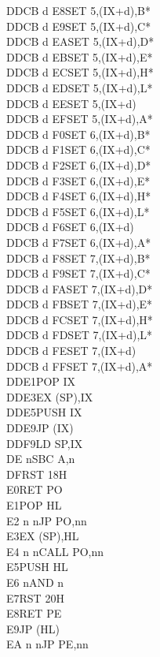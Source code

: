 \documentclass[oneside,a4paper]{book}
\begin{document}
\begin{multicols}{3}
{\begin{tabbing}
DDCB d E8\>SET 5,(IX+d),B*\\
DDCB d E9\>SET 5,(IX+d),C*\\
DDCB d EA\>SET 5,(IX+d),D*\\
DDCB d EB\>SET 5,(IX+d),E*\\
DDCB d EC\>SET 5,(IX+d),H*\\
DDCB d ED\>SET 5,(IX+d),L*\\
DDCB d EE\>SET 5,(IX+d)\\
DDCB d EF\>SET 5,(IX+d),A*\\
DDCB d F0\>SET 6,(IX+d),B*\\
DDCB d F1\>SET 6,(IX+d),C*\\
DDCB d F2\>SET 6,(IX+d),D*\\
DDCB d F3\>SET 6,(IX+d),E*\\
DDCB d F4\>SET 6,(IX+d),H*\\
DDCB d F5\>SET 6,(IX+d),L*\\
DDCB d F6\>SET 6,(IX+d)\\
DDCB d F7\>SET 6,(IX+d),A*\\
DDCB d F8\>SET 7,(IX+d),B*\\
DDCB d F9\>SET 7,(IX+d),C*\\
DDCB d FA\>SET 7,(IX+d),D*\\
DDCB d FB\>SET 7,(IX+d),E*\\
DDCB d FC\>SET 7,(IX+d),H*\\
DDCB d FD\>SET 7,(IX+d),L*\\
DDCB d FE\>SET 7,(IX+d)\\
DDCB d FF\>SET 7,(IX+d),A*\\
DDE1\>POP IX\\
DDE3\>EX (SP),IX\\
DDE5\>PUSH IX\\
DDE9\>JP (IX)\\
DDF9\>LD SP,IX\\
DE n\>SBC A,n\\
DF\>RST 18H\\
E0\>RET PO\\
E1\>POP HL\\
E2 n n\>JP PO,nn\\
E3\>EX (SP),HL\\
E4 n n\>CALL PO,nn\\
E5\>PUSH HL\\
E6 n\>AND n\\
E7\>RST 20H\\
E8\>RET PE\\
E9\>JP (HL)\\
EA n n\>JP PE,nn\\

\end{tabbing}}
\end{multicols}
\end{document}
